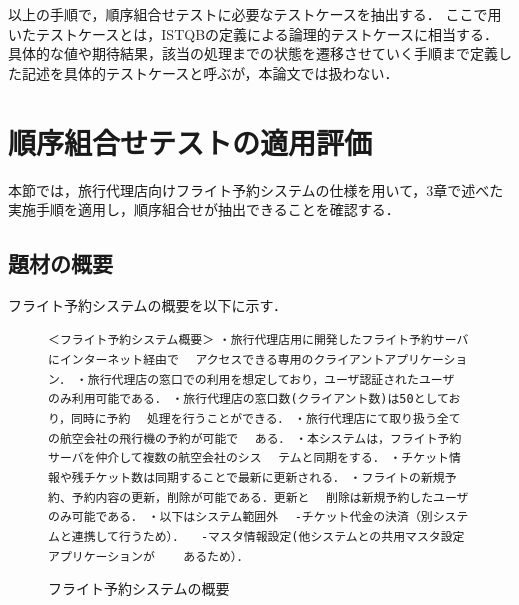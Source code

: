 \documentclass[a4paper,12pt]{jreport}
\begin{document}
以上の手順で，順序組合せテストに必要なテストケースを抽出する．
ここで用いたテストケースとは，ISTQBの定義による論理的テストケースに相当する\cite{ISTQB}．
具体的な値や期待結果，該当の処理までの状態を遷移させていく手順まで定義した記述を具体的テストケースと呼ぶが，本論文では扱わない．

\section{順序組合せテストの適用評価}

本節では，旅行代理店向けフライト予約システムの仕様を用いて，3章で述べた実施手順を適用し，順序組合せが抽出できることを確認する．
\subsection{題材の概要}
フライト予約システムの概要を以下に示す．
\begin{figure}[h]%
\vbox{%
{\scriptsize
\hbox{\verb/＜フライト予約システム概要＞/}
\hbox{\verb/・旅行代理店用に開発したフライト予約サーバにインターネット経由で/}
\hbox{\verb/　アクセスできる専用のクライアントアプリケーション．/}
\hbox{\verb/・旅行代理店の窓口での利用を想定しており，ユーザ認証されたユーザ/}
\hbox{\verb/　のみ利用可能である．/}
\hbox{\verb/・旅行代理店の窓口数(クライアント数)は50としており，同時に予約/}
\hbox{\verb/　処理を行うことができる．/}
\hbox{\verb/・旅行代理店にて取り扱う全ての航空会社の飛行機の予約が可能で/}
\hbox{\verb/　ある．/}
\hbox{\verb/・本システムは，フライト予約サーバを仲介して複数の航空会社のシス/}
\hbox{\verb/　テムと同期をする．/}
\hbox{\verb/・チケット情報や残チケット数は同期することで最新に更新される．/}
\hbox{\verb/・フライトの新規予約、予約内容の更新，削除が可能である．更新と/}
\hbox{\verb/　削除は新規予約したユーザのみ可能である．/}
\hbox{\verb/・以下はシステム範囲外/}
\hbox{\verb/　-チケット代金の決済（別システムと連携して行うため）．/}
\hbox{\verb/　-マスタ情報設定(他システムとの共用マスタ設定アプリケーションが/}
\hbox{\verb/　　あるため）．/}
}
}
\begin{center}
\end{center}
\caption{フライト予約システムの概要}
\label{OVSPEC}
\end{figure}
\end{document}
